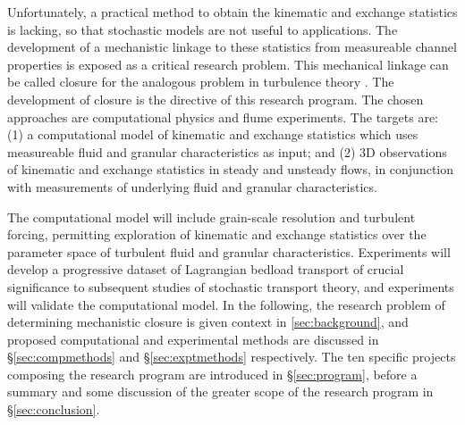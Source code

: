 Unfortunately, a practical method to obtain the kinematic and exchange statistics is lacking, so that stochastic models are not useful to applications. The development of a mechanistic linkage to these statistics from measureable channel properties is exposed as a critical research problem. This mechanical linkage can be called closure for the analogous problem in turbulence theory \citep{Heyman2016}. The development of closure is the directive of this research program. The chosen approaches are computational physics and flume experiments. The targets are: (1) a computational model of kinematic and exchange statistics which uses measureable fluid and granular characteristics as input; and (2) 3D observations of kinematic and exchange statistics in steady and unsteady flows, in conjunction with measurements of underlying fluid and granular characteristics. 
\bigskip 

The computational model will include grain-scale resolution and turbulent forcing, permitting exploration of kinematic and exchange statistics over the parameter space of turbulent fluid and granular characteristics. Experiments will develop a progressive dataset of Lagrangian bedload transport of crucial significance to subsequent studies of stochastic transport theory, and experiments will validate the computational model. In the following, the research problem of determining mechanistic closure is given context in \ref{sec:background}, and proposed computational and experimental methods are discussed in  \S \ref{sec:compmethods} and \S \ref{sec:exptmethods} respectively. The ten specific projects composing the research program are introduced in \S \ref{sec:program}, before a summary and some discussion of the greater scope of the research program in \S \ref{sec:conclusion}.

